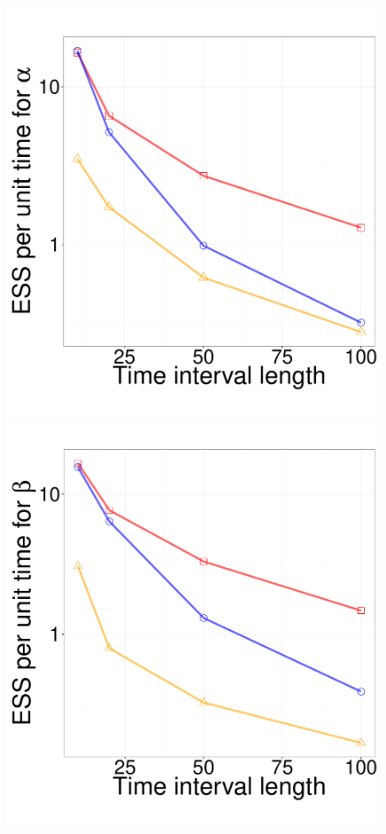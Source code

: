 {  \begin{figure}%
  \centering
  \begin{minipage}[hp]{0.24\linewidth}
  \centering
    \includegraphics [width=0.99\textwidth, angle=0]{figures_new_apr12/alpha_ESS_T_fix_18apr27.pdf}
    \end{minipage}
  \begin{minipage}[hp]{0.24\linewidth}
  \centering
    \includegraphics [width=0.99\textwidth, angle=0]{figures_new_apr12/beta_ESS_T_fix_18apr27.pdf}

\end{minipage}
\end{figure}}
